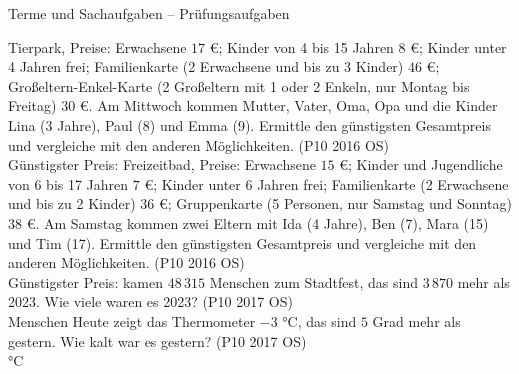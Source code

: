 \begin{aufgabe}{Terme und Sachaufgaben – Prüfungsaufgaben}
\begin{teile}
\teil Tierpark, Preise: Erwachsene $17$ €; Kinder von 4 bis 15 Jahren $8$ €; Kinder unter 4 Jahren frei; Familienkarte (2 Erwachsene und bis zu 3 Kinder) $46$ €; Großeltern-Enkel-Karte (2 Großeltern mit 1 oder 2 Enkeln, nur Montag bis Freitag) $30$ €. Am Mittwoch kommen Mutter, Vater, Oma, Opa und die Kinder Lina (3 Jahre), Paul (8) und Emma (9). Ermittle den günstigsten Gesamtpreis und vergleiche mit den anderen Möglichkeiten. \hfill (P10 2016 OS) \\ Günstigster Preis: \leerfeld[€]
\teil Freizeitbad, Preise: Erwachsene $15$ €; Kinder und Jugendliche von 6 bis 17 Jahren $7$ €; Kinder unter 6 Jahren frei; Familienkarte (2 Erwachsene und bis zu 2 Kinder) $36$ €; Gruppenkarte (5 Personen, nur Samstag und Sonntag) $38$ €. Am Samstag kommen zwei Eltern mit Ida (4 Jahre), Ben (7), Mara (15) und Tim (17). Ermittle den günstigsten Gesamtpreis und vergleiche mit den anderen Möglichkeiten. \hfill (P10 2016 OS) \\ Günstigster Preis: \leerfeld[€]
 kamen $48\,315$ Menschen zum Stadtfest, das sind $3\,870$ mehr als 2023. Wie viele waren es 2023? \hfill (P10 2017 OS) \\ \leerfeld Menschen
\teil Heute zeigt das Thermometer $-3$ °C, das sind $5$ Grad mehr als gestern. Wie kalt war es gestern? \hfill (P10 2017 OS) \\ \leerfeld °C
\end{teile}
\end{aufgabe}
